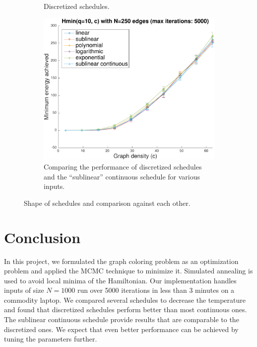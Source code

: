 \documentclass{article}
\begin{document}
\begin{figure}[h]
\begin{subfigure}[t]{.33\linewidth}
      \caption{Discretized schedules.}
      \label{fig:schedules_discretized_shape}
    \end{subfigure}%
    \begin{subfigure}[t]{.33\linewidth} %
      \centering
      \includegraphics[width=1\linewidth]{figures/schedules_evaluation.pdf}
      \caption{Comparing the performance of discretized schedules and the ``sublinear'' continuous schedule for various inputs.}
      \label{fig:schedules_evaluation}
    \end{subfigure}
    \caption{Shape of schedules and comparison against each other.}
    \label{fig:schedules}
  \end{figure}


  \section*{Conclusion}
  In this project, we formulated the graph coloring problem as an optimization problem and applied the MCMC technique to minimize it. Simulated annealing is used to avoid local minima of the Hamiltonian. Our implementation handles inputs of size $N=1000$ run over 5000 iterations in less than 3 minutes on a commodity laptop. We compared several schedules to decrease the temperature and found that discretized schedules perform better than most continuous ones. The sublinear continuous schedule provide results that are comparable to the discretized ones. We expect that even better performance can be achieved by tuning the parameters further.
\end{document}
